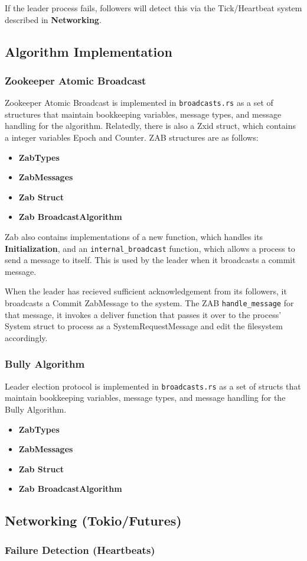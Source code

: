 \documentclass{article}
\begin{document}
        If the leader process fails, followers will detect this via the Tick/Heartbeat system described in \textbf{Networking}.



\subsection*{Algorithm Implementation}
    \subsubsection*{Zookeeper Atomic Broadcast}
    Zookeeper Atomic Broadcast is implemented in \verb|broadcasts.rs| as a set of structures that maintain bookkeeping variables, message types, and message handling for the algorithm. Relatedly, there is also a Zxid struct, which contains a integer variables Epoch and Counter. ZAB structures are as follows:

\begin{itemize}
    \item\textbf{ZabTypes}
    \item\textbf{ZabMessages}
    \item\textbf{Zab Struct}
    \item\textbf{Zab BroadcastAlgorithm}
\end{itemize}

    Zab also contains implementations of a new function, which handles its \textbf{Initialization}, and an \verb|internal_broadcast| function, which allows a process to send a message to itself. This is used by the leader when it broadcasts a commit message.

    When the leader has recieved sufficient acknowledgement from its followers, it broadcasts a Commit ZabMessage to the system. The ZAB \verb|handle_message| for that message, it invokes a deliver function that passes it over to the process' System struct to process as a SystemRequestMessage and edit the filesystem accordingly.


    \subsubsection*{Bully Algorithm}
    Leader election protocol is implemented in \verb|broadcasts.rs| as a set of structs that maintain bookkeeping variables, message types, and message handling for the Bully Algorithm.

\begin{itemize}
    \item\textbf{ZabTypes}
    \item\textbf{ZabMessages}
    \item\textbf{Zab Struct}
    \item\textbf{Zab BroadcastAlgorithm}
\end{itemize}


\subsection*{Networking (Tokio/Futures)}
\subsubsection*{Failure Detection (Heartbeats)}
\end{document}
